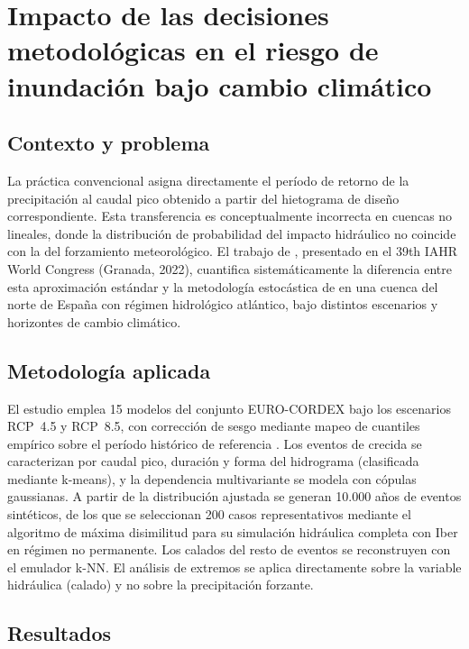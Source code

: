 \clearpage
\section{Impacto de las decisiones metodológicas en el riesgo de inundación bajo cambio climático}
\label{sec:caso_iahr2022}

\subsection{Contexto y problema}

La práctica convencional asigna directamente el período de retorno de la precipitación al caudal pico obtenido a partir del hietograma de diseño correspondiente. Esta transferencia es conceptualmente incorrecta en cuencas no lineales, donde la distribución de probabilidad del impacto hidráulico no coincide con la del forzamiento meteorológico. El trabajo de \textcite{deljesus2022iahr}, presentado en el 39th IAHR World Congress (Granada, 2022), cuantifica sistemáticamente la diferencia entre esta aproximación estándar y la metodología estocástica de \hydra en una cuenca del norte de España con régimen hidrológico atlántico, bajo distintos escenarios y horizontes de cambio climático.

\subsection{Metodología aplicada}

El estudio emplea 15 modelos del conjunto EURO-CORDEX bajo los escenarios RCP~4.5 y RCP~8.5, con corrección de sesgo mediante mapeo de cuantiles empírico sobre el período histórico de referencia \parencite{teutschbein2012biascorrection}. Los eventos de crecida se caracterizan por caudal pico, duración y forma del hidrograma (clasificada mediante k-means), y la dependencia multivariante se modela con cópulas gaussianas. A partir de la distribución ajustada se generan 10.000 años de eventos sintéticos, de los que se seleccionan 200 casos representativos mediante el algoritmo de máxima disimilitud para su simulación hidráulica completa con Iber en régimen no permanente. Los calados del resto de eventos se reconstruyen con el emulador k-NN. El análisis de extremos se aplica directamente sobre la variable hidráulica (calado) y no sobre la precipitación forzante.

\subsection{Resultados}

